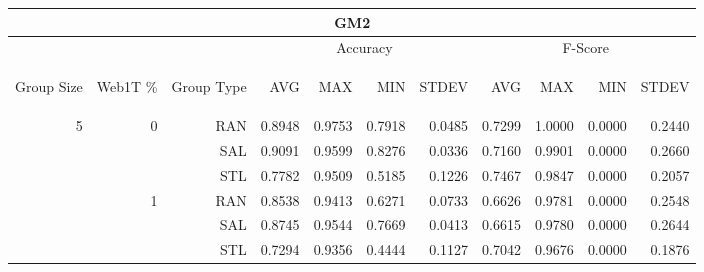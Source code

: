 \begin{center}
\begin{table}[htbp]
\begin{tabular}{ | r | r | r | r | r | r | r | r | r | r | r |}
\hline
\multicolumn{11}{|c|}{GM2}\\
\hline
 & & & \multicolumn{4}{|c|}{Accuracy} & \multicolumn{4}{|c|}{F-Score}\\ \cline{4-11}
\begin{sideways}Group Size\end{sideways} & \begin{sideways}Web1T \%\end{sideways} & \begin{sideways}Group Type\end{sideways} & \begin{sideways}AVG\end{sideways} & \begin{sideways}MAX\end{sideways} & \begin{sideways}MIN\end{sideways} & \begin{sideways}STDEV\end{sideways} & \begin{sideways}AVG\end{sideways} & \begin{sideways}MAX\end{sideways} & \begin{sideways}MIN\end{sideways} & \begin{sideways}STDEV\end{sideways}\\
\hline
\multirow{18}{*}{5}
 & \multirow{3}{*}{0} & RAN & 0.8948 & 0.9753 & 0.7918 & 0.0485 & 0.7299 & 1.0000 & 0.0000 & 0.2440\\ \cline{3-11}
 &   & SAL & 0.9091 & 0.9599 & 0.8276 & 0.0336 & 0.7160 & 0.9901 & 0.0000 & 0.2660\\ \cline{3-11}
 &   & STL & 0.7782 & 0.9509 & 0.5185 & 0.1226 & 0.7467 & 0.9847 & 0.0000 & 0.2057\\ \cline{2-11}
 & \multirow{3}{*}{1} & RAN & 0.8538 & 0.9413 & 0.6271 & 0.0733 & 0.6626 & 0.9781 & 0.0000 & 0.2548\\ \cline{3-11}
 &   & SAL & 0.8745 & 0.9544 & 0.7669 & 0.0413 & 0.6615 & 0.9780 & 0.0000 & 0.2644\\ \cline{3-11}
 &   & STL & 0.7294 & 0.9356 & 0.4444 & 0.1127 & 0.7042 & 0.9676 & 0.0000 & 0.1876\\ \cline{2-11}

\end{tabular}
\end{table}
\end{center}
